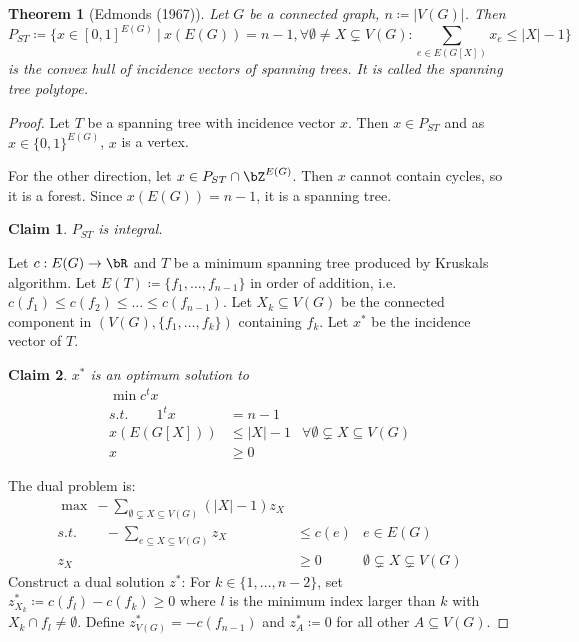 \documentclass[11pt, a4paper]{article}
\newcommand{\abs}[1]{\left\lvert#1\right\rvert}
\newcommand{\set}[1]{\{#1\}}
\newtheorem{theorem}{Theorem}[section]
\newtheorem*{claim}{Claim}
\theoremstyle{remark}
\theoremstyle{definition}
\begin{document}
\begin{theorem}[Edmonds (1967)]
	Let $G$ be a connected graph, $n\coloneqq \abs{V(G)}$. Then
	\[P_{ST}\coloneqq \set{x\in [0,1]^{E(G)}\ |\ x(E(G))=n-1,\forall \emptyset\neq X\subsetneq V(G): \sum_{e\in E(G[X])}x_e\leq \abs{X}-1}\]
	is the convex hull of incidence vectors of spanning trees. It is
	called the spanning tree polytope.
\end{theorem}
\begin{proof}
	Let $T$ be a spanning tree with incidence vector $x$. Then $x\in P_{ST}$
	and as $x\in \set{0,1}^{E(G)}$, $x$ is a vertex.

	For the other direction, let $x\in P_{ST}\cap\bZ^{E(G)}$. Then $x$
	cannot contain cycles, so it is a forest. Since $x(E(G))=n-1$, it is
	a spanning tree.
	\begin{claim}
		$P_{ST}$ is integral.
	\end{claim}
	Let $c: E(G)\to\bR$ and $T$ be a minimum spanning tree produced by Kruskals
	algorithm. Let $E(T)\coloneqq \set{f_1,\ldots,f_{n-1}}$ in order of addition,
	i.e. $c(f_1)\leq c(f_2)\leq\ldots\leq c(f_{n-1})$. Let $X_k\subseteq V(G)$
	be the connected component in $(V(G),\set{f_1,\ldots,f_k})$ containing $f_k$.
	Let $x^*$ be the incidence vector of $T$.
	\begin{claim}
		$x^*$ is an optimum solution to
		\begin{align*}
			\min c^tx                                                                      \\
			s.t.\qquad 1^tx & =n-1                                                         \\
			x(E(G[X]))      & \leq \abs{X}-1 & \forall \emptyset\subsetneq X\subseteq V(G) \\
			x&\geq 0
		\end{align*}
	\end{claim}
	The dual problem is:
	\begin{align*}
		\max\ -\sum_{\emptyset\subsetneq X\subseteq V(G)}(\abs{X}-1)z_X                                     \\
		s.t.\qquad -\sum_{e\subseteq X\subseteq V(G)}z_X & \leq c(e) & e\in E(G)                            \\
		z_X                                              & \geq 0    & \emptyset\subsetneq X\subsetneq V(G)
	\end{align*}
	Construct a dual solution $z^*$: For $k\in\set{1,\ldots,n-2}$, set
	$z^*_{X_k}\coloneqq c(f_l)-c(f_k)\geq0$ where $l$ is the minimum index larger
	than $k$ with $X_k\cap f_l\neq\emptyset$. Define $z^*_{V(G)}=-c(f_{n-1})$
	and $z^*_A\coloneqq 0$ for all other $A\subseteq V(G)$.


\end{proof}
\end{document}
